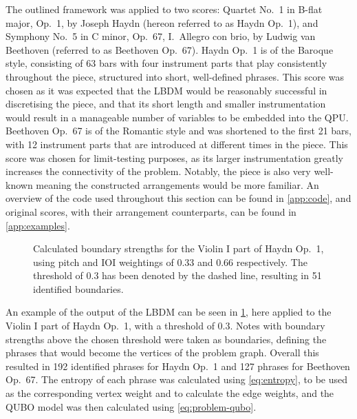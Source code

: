 \documentclass[12pt]{article}
\theoremstyle{definition}
\begin{document}
The outlined framework was applied to two scores: Quartet No.\ 1 in B-flat major, Op.\ 1, by Joseph Haydn (hereon referred to as Haydn Op.\ 1), and Symphony No.\ 5 in C minor, Op.\ 67, I.\ Allegro con brio, by Ludwig van Beethoven (referred to as Beethoven Op.\ 67). Haydn Op.\ 1 is of the Baroque style, consisting of 63 bars with four instrument parts that play consistently throughout the piece, structured into short, well-defined phrases. This score was chosen as it was expected that the LBDM would be reasonably successful in discretising the piece, and that its short length and smaller instrumentation would result in a manageable number of variables to be embedded into the QPU. Beethoven Op.\ 67 is of the Romantic style and was shortened to the first 21 bars, with 12 instrument parts that are introduced at different times in the piece. This score was chosen for limit-testing purposes, as its larger instrumentation greatly increases the connectivity of the problem. Notably, the piece is also very well-known meaning the constructed arrangements would be more familiar.
An overview of the code used throughout this section can be found in \cref{app:code}, and original scores, with their arrangement counterparts, can be found in \cref{app:examples}.

\begin{figure}[h]
    \small
    
    \caption{Calculated boundary strengths for the Violin I part of Haydn Op.\ 1, using pitch and IOI weightings of \num{0.33} and \num{0.66} respectively. The threshold of \num{0.3} has been denoted by the dashed line, resulting in \num{51} identified boundaries.}
    \label{fig:phrase-extraction}
\end{figure}

An example of the output of the LBDM can be seen in \cref{fig:phrase-extraction}, here applied to the {Violin I} part of Haydn Op.\ 1, with a threshold of \num{0.3}. Notes with boundary strengths above the chosen threshold were taken as boundaries, defining the phrases that would become the vertices of the problem graph. Overall this resulted in \num{192} identified phrases for Haydn Op.\ 1 and \num{127} phrases for Beethoven Op.\ 67. The entropy of each phrase was calculated using \cref{eq:entropy}, to be used as the corresponding vertex weight and to calculate the edge weights, and the QUBO model was then calculated using \cref{eq:problem-qubo}.
\end{document}
